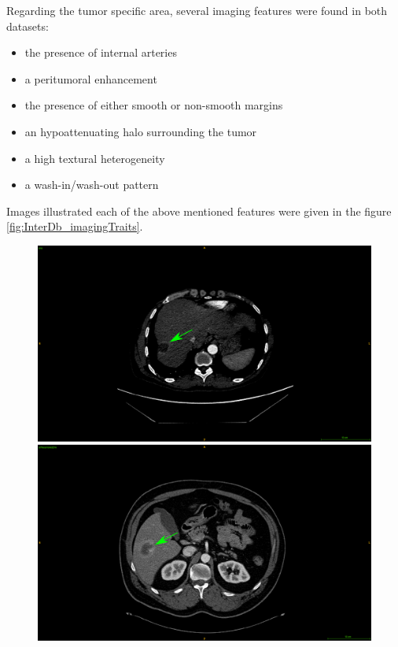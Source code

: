 \documentclass[]{article}
\begin{document}
Regarding the tumor specific area, several imaging features were found in both datasets:
\begin{itemize}
\item the presence of internal arteries
\item a peritumoral enhancement
\item the presence of either smooth or non-smooth margins
\item an hypoattenuating halo surrounding the tumor
\item a high textural heterogeneity
\item a wash-in/wash-out pattern 
\end{itemize}
Images illustrated each of the above mentioned features were given in the figure \ref{fig:InterDb_imagingTraits}.
\begin{figure}[!h]
	\centering
	\begin{minipage}{0.45\linewidth}
		\includegraphics[width=\linewidth]{../Contributions/images/ImagingTraits/ResizeGDB_peritumoralEnhancement}
	\end{minipage} \hspace{-0.1cm}
	\begin{minipage}{0.45\linewidth}
		\includegraphics[width=\linewidth]{../Contributions/images/ImagingTraits/ResizeTCIA_peritumoralEnhancement}

\end{minipage}
\end{figure}
\end{document}

